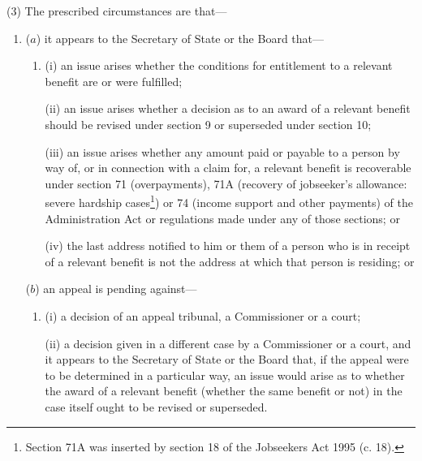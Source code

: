 \documentclass[12pt,a4paper]{article}
\begin{document}
(3) The prescribed circumstances are that—
\begin{enumerate}\item[]
($a$) it appears to the Secretary of State 
or the Board  %
that—
\begin{enumerate}\item[]
(i) an issue arises whether the conditions for entitlement to a relevant benefit are or were fulfilled;

(ii) an issue arises whether a decision as to an award of a relevant benefit should be revised under section 9 or superseded under section 10;

(iii) an issue arises whether any amount paid or payable to a person by way of, or in connection with a claim for, a relevant benefit is recoverable under section 71 (overpayments), 71A (recovery of jobseeker’s allowance: severe hardship cases\footnote{\frenchspacing Section 71A was inserted by section 18 of the Jobseekers Act 1995 (c. 18).}) or 74 (income support and other payments) of the Administration Act or regulations made under any of those sections; or

(iv) the last address notified to him 
or them %
of a person who is in receipt of a relevant benefit is not the address at which that person is residing; or
\end{enumerate}

($b$) an appeal is pending against—
\begin{enumerate}\item[]
(i) a decision of an appeal tribunal, a Commissioner or a court;

(ii) a decision given in a different case by a Commissioner or a court, and it appears to the Secretary of State 
or the Board  %
that, if the appeal were to be determined in a particular way, an issue would arise as to whether the award of a relevant benefit (whether the same benefit or not) in the case itself ought to be revised or superseded.
\end{enumerate}
\end{enumerate}

%
%
\end{document}
